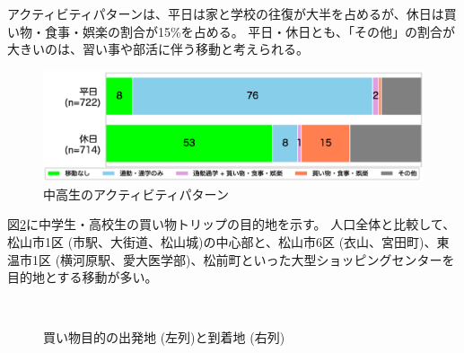 \documentclass[a4paper,12pt, uplatex]{jsbook}
\begin{document}
アクティビティパターンは、平日は家と学校の往復が大半を占めるが、休日は買い物・食事・娯楽の割合が15\%を占める。
平日・休日とも、「その他」の割合が大きいのは、習い事や部活に伴う移動と考えられる。
%
\begin{figure}[htbp]
    \centering
    \includegraphics[width=1.0\textwidth]{picture/activity_pattern_中高生.eps}
    \caption{中高生のアクティビティパターン}
    \label{fig:activity_pattern_school}
\end{figure}

図\ref{fig:od_shopping_school}に中学生・高校生の買い物トリップの目的地を示す。
人口全体と比較して、松山市1区 (市駅、大街道、松山城)の中心部と、松山市6区 (衣山、宮田町)、東温市1区 (横河原駅、愛大医学部)、松前町といった大型ショッピングセンターを目的地とする移動が多い。
%
\begin{figure}[htbp]
  \centering
  \\%
    \caption{買い物目的の出発地 (左列)と到着地 (右列)}
  	\label{fig:od_shopping_school}
\end{figure}
\end{document}
